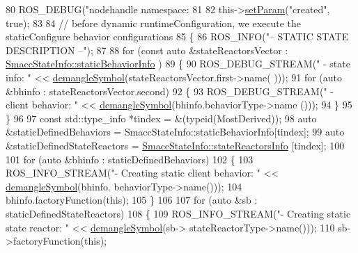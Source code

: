 \begin{DoxyCode}
{{80     ROS\_DEBUG(\textcolor{stringliteral}{"nodehandle namespace: %
81 
82     this->\hyperlink{classsmacc_1_1ISmaccState_a0b6c531ca8c446052022308548f55b92}{setParam}(\textcolor{stringliteral}{"created"}, \textcolor{keyword}{true});
83 
84     \textcolor{comment}{// before dynamic runtimeConfiguration, we execute the staticConfigure behavior configurations}
85     \{
86       ROS\_INFO(\textcolor{stringliteral}{"-- STATIC STATE DESCRIPTION --"});
87 
88       \textcolor{keywordflow}{for} (\textcolor{keyword}{const} \textcolor{keyword}{auto} &stateReactorsVector : \hyperlink{classsmacc_1_1introspection_1_1SmaccStateInfo_ad3d8b3450060cb0b91f38fb2fe0a7678}{SmaccStateInfo::staticBehaviorInfo}
      )
89       \{
90         ROS\_DEBUG\_STREAM(\textcolor{stringliteral}{" - state info: "} << \hyperlink{namespacesmacc_1_1introspection_a2f495108db3e57604d8d3ff5ef030302}{demangleSymbol}(stateReactorsVector.first->name(
      )));
91         \textcolor{keywordflow}{for} (\textcolor{keyword}{auto} &bhinfo : stateReactorsVector.second)
92         \{
93           ROS\_DEBUG\_STREAM(\textcolor{stringliteral}{" - client behavior: "} << \hyperlink{namespacesmacc_1_1introspection_a2f495108db3e57604d8d3ff5ef030302}{demangleSymbol}(bhinfo.behaviorType->name
      ()));
94         \}
95       \}
96 
97       \textcolor{keyword}{const} std::type\_info *tindex = &(\textcolor{keyword}{typeid}(MostDerived));
98       \textcolor{keyword}{auto} &staticDefinedBehaviors = SmaccStateInfo::staticBehaviorInfo[tindex];
99       \textcolor{keyword}{auto} &staticDefinedStateReactors = \hyperlink{classsmacc_1_1introspection_1_1SmaccStateInfo_abd1d6ca5060c87f6bd11fde3e5b2ac4d}{SmaccStateInfo::stateReactorsInfo}
      [tindex];
100 
101       \textcolor{keywordflow}{for} (\textcolor{keyword}{auto} &bhinfo : staticDefinedBehaviors)
102       \{
103         ROS\_INFO\_STREAM(\textcolor{stringliteral}{"- Creating static client behavior: "} << \hyperlink{namespacesmacc_1_1introspection_a2f495108db3e57604d8d3ff5ef030302}{demangleSymbol}(bhinfo.
      behaviorType->name()));
104         bhinfo.factoryFunction(\textcolor{keyword}{this});
105       \}
106 
107       \textcolor{keywordflow}{for} (\textcolor{keyword}{auto} &sb : staticDefinedStateReactors)
108       \{
109         ROS\_INFO\_STREAM(\textcolor{stringliteral}{"- Creating static state reactor: "} << \hyperlink{namespacesmacc_1_1introspection_a2f495108db3e57604d8d3ff5ef030302}{demangleSymbol}(sb->
      stateReactorType->name()));
110         sb->factoryFunction(\textcolor{keyword}{this});
}}}
\end{DoxyCode}
